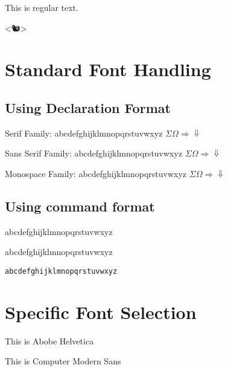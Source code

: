 \documentclass[11pt]{article}
\begin{document}
This is regular text.

<{\emoji 🐿}>

\section{Standard Font Handling}

\subsection{Using Declaration Format}

\rmfamily 
Serif Family:
abcdefghijklmnopqrstuvwxyz
$\Sigma \Omega \Longrightarrow \Downarrow$

\sffamily 
Sans Serif Family:
abcdefghijklmnopqrstuvwxyz
$\Sigma \Omega \Longrightarrow \Downarrow$

\ttfamily 
Monospace Family:
abcdefghijklmnopqrstuvwxyz
$\Sigma \Omega \Longrightarrow \Downarrow$

\subsection{Using command format}

\textsf{abcdefghijklmnopqrstuvwxyz}\par
\textrm{abcdefghijklmnopqrstuvwxyz}\par
\texttt{abcdefghijklmnopqrstuvwxyz}



\section{Specific Font Selection}

{
    This is Abobe Helvetica
}

{
    This is Computer Modern Sans
}
\end{document}
